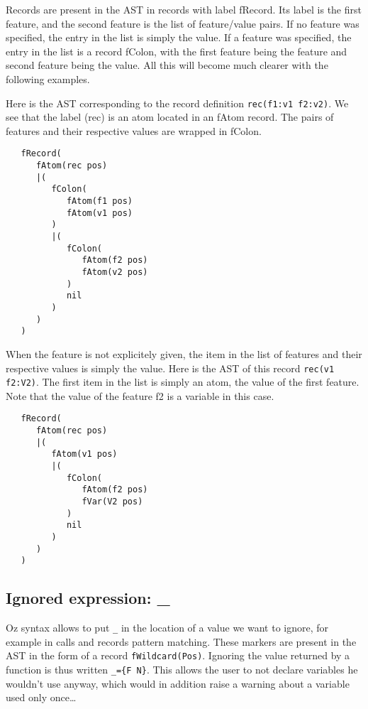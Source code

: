 \documentclass[a4paper]{memoir}
\begin{document}
Records are present in the AST in records with label fRecord. Its label is the first feature, and the second feature is the list of feature/value pairs. If no feature was specified, the entry in the list is simply the value. If a feature was specified, the entry in the list is a record fColon, with the first feature being the feature and second feature being the value. All this will become much clearer with the following examples.

Here is the AST corresponding to the record definition \lstinline!rec(f1:v1 f2:v2)!. We see that the label (rec) is an atom located in an fAtom record. The pairs of features and their respective values are wrapped in fColon.

\begin{lstlisting}
   fRecord(
      fAtom(rec pos)
      |(
         fColon(
            fAtom(f1 pos)
            fAtom(v1 pos)
         )
         |(
            fColon(
               fAtom(f2 pos)
               fAtom(v2 pos)
            )
            nil
         )
      )
   )
\end{lstlisting}

When the feature is not explicitely given, the item in the list of features and their respective values is simply the value. Here is the AST of this record \lstinline!rec(v1 f2:V2)!. The first item in the list is simply an atom, the value of the first feature. Note that the value of the feature f2 is a variable in this case.

\begin{lstlisting}
   fRecord(
      fAtom(rec pos)
      |(
         fAtom(v1 pos)
         |(
            fColon(
               fAtom(f2 pos)
               fVar(V2 pos)
            )
            nil
         )
      )
   )
\end{lstlisting}


\subsection{Ignored expression: \_}\label{sec:input:wildcard}
Oz syntax allows to put \lstinline!_! in the location of a value we want to ignore, for example in calls and records pattern matching. These markers are present in the AST in the form of a record \lstinline!fWildcard(Pos)!.
Ignoring the value returned by a function is thus written \lstinline!_={F N}!. 
This allows the user to not declare variables he wouldn't use anyway, which would in addition raise a warning about a variable used only once\ldots
\end{document}
